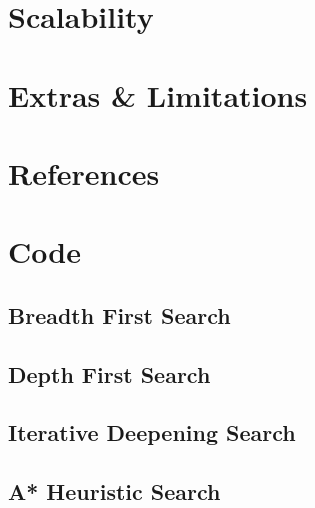\documentclass[a4paper]{article}
\begin{document}
\section{Scalability}


\section{Extras \& Limitations}

\section{References}


\newpage
\section{Code}
\subsection{Breadth First Search}


\newpage
\subsection{Depth First Search}


\newpage
\subsection{Iterative Deepening Search}


\newpage
\subsection{A* Heuristic Search}

\end{document}
